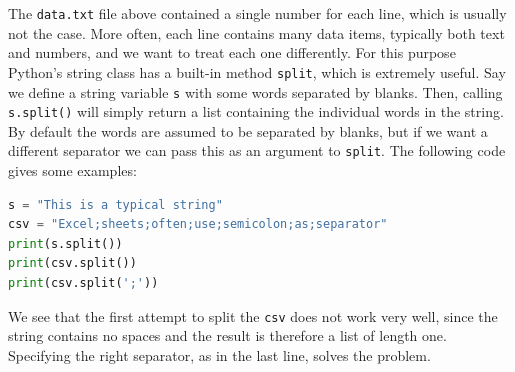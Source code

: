 \documentclass[graybox,envcountchap,sectrefs,final]{svmonodo}
\begin{document}
The \texttt{data.txt} file above contained a single number for each line, which is usually not the case. More often, each line contains
many data items, typically both text and numbers, and we want to treat each one differently. For this purpose
Python's string class has a built-in method \texttt{split}, which is extremely useful. Say we define a string variable \texttt{s} with some words
separated by blanks. Then, calling \texttt{s.split()} will simply return a list containing the individual words in the string. By
default the words are assumed to be separated by blanks, but if we want a different separator we can pass this as an argument
to \texttt{split}. The following code gives some examples:
\begin{lstlisting}[language=Python,style=blue1]
s = "This is a typical string"
csv = "Excel;sheets;often;use;semicolon;as;separator"
print(s.split())
print(csv.split())
print(csv.split(';'))
\end{lstlisting}
We see that the first attempt to split the \texttt{csv} does not work very well, since the string contains no spaces and the
result is therefore a list of length one. Specifying the right separator, as in the last line, solves the problem.
\end{document}
